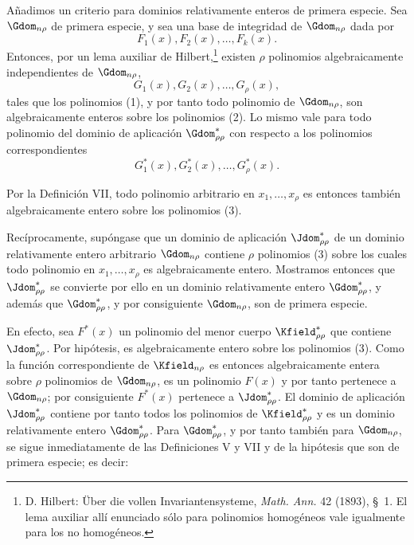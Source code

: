 \documentclass[11pt]{article}
\begin{document}
Añadimos un criterio para dominios relativamente enteros de primera especie. Sea $\Gdom_{n\rho}$ de primera especie, y sea una base de integridad de $\Gdom_{n\rho}$ dada por
\begin{equation}
  F_1(x),F_2(x),\ldots,F_k(x).
\tag{1}
\end{equation}
Entonces, por un lema auxiliar de Hilbert,\footnote{D. Hilbert: Über die vollen Invariantensysteme, \emph{Math. Ann.} 42 (1893), \S\ 1. El lema auxiliar allí enunciado sólo para polinomios homogéneos vale igualmente para los no homogéneos.} existen $\rho$ polinomios algebraicamente independientes de $\Gdom_{n\rho}$,
\begin{equation}
  G_1(x),G_2(x),\ldots,G_\rho(x),
\tag{2}
\end{equation}
tales que los polinomios (1), y por tanto todo polinomio de $\Gdom_{n\rho}$, son algebraicamente enteros sobre los polinomios (2). Lo mismo vale para todo polinomio del dominio de aplicación $\Gdom^*_{\rho\rho}$ con respecto a los polinomios correspondientes
\begin{equation}
  G_1^*(x),G_2^*(x),\ldots,G_\rho^*(x).
\tag{3}
\end{equation}

Por la Definición VII, todo polinomio arbitrario en $x_1,\ldots,x_\rho$ es entonces también algebraicamente entero sobre los polinomios (3).

Recíprocamente, supóngase que un dominio de aplicación $\Jdom^*_{\rho\rho}$ de un dominio relativamente entero arbitrario $\Gdom_{n\rho}$ contiene $\rho$ polinomios (3) sobre los cuales todo polinomio en $x_1,\ldots,x_\rho$ es algebraicamente entero. Mostramos entonces que $\Jdom^*_{\rho\rho}$ se convierte por ello en un dominio relativamente entero $\Gdom^*_{\rho\rho}$, y además que $\Gdom^*_{\rho\rho}$, y por consiguiente $\Gdom_{n\rho}$, son de primera especie.

En efecto, sea $F^*(x)$ un polinomio del menor cuerpo $\Kfield^*_{\rho\rho}$ que contiene $\Jdom^*_{\rho\rho}$. Por hipótesis, es algebraicamente entero sobre los polinomios (3). Como la función correspondiente de $\Kfield_{n\rho}$ es entonces algebraicamente entera sobre $\rho$ polinomios de $\Gdom_{n\rho}$, es un polinomio $F(x)$ y por tanto pertenece a $\Gdom_{n\rho}$; por consiguiente $F^*(x)$ pertenece a $\Jdom^*_{\rho\rho}$. El dominio de aplicación $\Jdom^*_{\rho\rho}$ contiene por tanto todos los polinomios de $\Kfield^*_{\rho\rho}$ y es un dominio relativamente entero $\Gdom^*_{\rho\rho}$. Para $\Gdom^*_{\rho\rho}$, y por tanto también para $\Gdom_{n\rho}$, se sigue inmediatamente de las Definiciones V y VII y de la hipótesis que son de primera especie; es decir:
\end{document}
